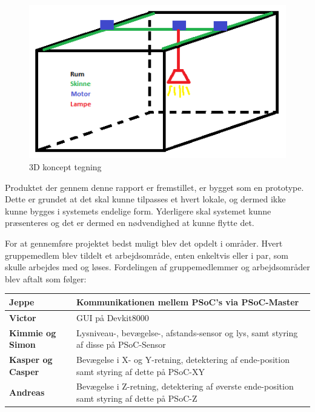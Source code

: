 \begin{figure}[H] \centering
    \includegraphics[width=\textwidth]{Filer/3D_Koncept.png}
    \caption{3D koncept tegning}
    \label{fig:3D_Koncept}
\end{figure}

Produktet der gennem denne rapport er fremstillet, er bygget som en prototype. Dette er grundet at det skal kunne tilpasses et hvert lokale, og dermed ikke kunne bygges i systemets endelige form. Yderligere skal systemet kunne præsenteres og det er dermed en nødvendighed at kunne flytte det.  	

For at gennemføre projektet bedst muligt blev det opdelt i områder. Hvert gruppemedlem blev tildelt et arbejdsområde, enten enkeltvis eller i par, som skulle arbejdes med og løses. Fordelingen af gruppemedlemmer og arbejdsområder blev aftalt som følger: 

\begin{table}[H] \centering
\begin{tabular}{|l|p{10cm}|}
	\hline
	\textbf{Jeppe}		
	    & Kommunikationen mellem PSoC’s via PSoC-Master
	\\ \hline
	\textbf{Victor} 		
	    & GUI på Devkit8000
	\\ \hline
	\textbf{Kimmie og Simon} 		
	    & Lysniveau-, bevægelse-, afstands-sensor og lys, samt styring af disse på PSoC-Sensor
	\\ \hline
	\textbf{Kasper og Casper} 	
	    & Bevægelse i X- og Y-retning, detektering af ende-position samt styring af dette på PSoC-XY
	\\ \hline
	\textbf{Andreas} 			
	    & Bevægelse i Z-retning, detektering af øverste ende-position samt styring af dette på PSoC-Z
	\\ \hline
\end{tabular}
\end{table}